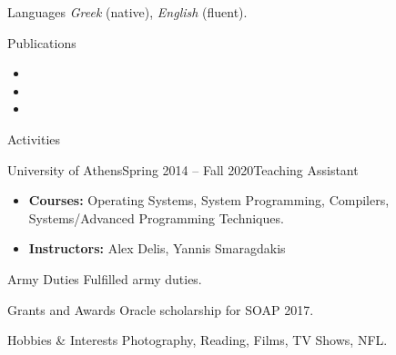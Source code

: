 \documentclass{resume}
\begin{document}
\begin{rSection}{Languages}
  \textit{Greek} (native), \textit{English} (fluent).
\end{rSection}

\begin{rSection}{Publications}
  \begin{rSubsection}{}{}{}{}
    \begin{itemize}[label={-}]
      \setlength\itemsep{-0.5em}
        \item {}
        \item {}
        \item {}
    \end{itemize}
  \end{rSubsection}
\end{rSection}

\begin{rSection}{Activities}
  \begin{rSubsection}{University of Athens}{Spring 2014 -- Fall 2020}{Teaching Assistant}{}
    \begin{itemize}[label={-}]
      \setlength\itemsep{-0.5em}
        \item {\bf Courses:}  Operating Systems, System Programming, Compilers, Systems/Advanced Programming Techniques.
        \item {\bf Instructors:} Alex Delis, Yannis Smaragdakis
      \end{itemize}
    \end{rSubsection}
\end{rSection}


\begin{rSection}{Army Duties}
Fulfilled army duties.
\end{rSection}

\begin{rSection}{Grants and Awards}
  Oracle scholarship for SOAP 2017.
\end{rSection}


\begin{rSection}{Hobbies \& Interests}
  Photography, Reading, Films, TV Shows, NFL.
\end{rSection}
\end{document}
